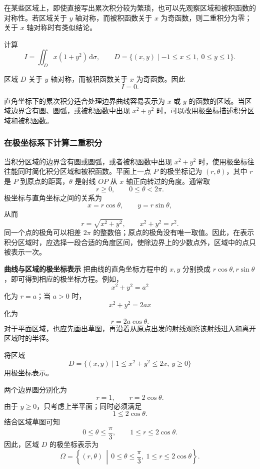 \documentclass[fontset=fandol]{ctexart}
\newenvironment{custom}[1]{\par\noindent\textbf{#1}\quad}{\par\vspace{0.8em}}
\newcommand{\dd}{\mathrm{d}}
\begin{document}
在某些区域上，即使直接写出累次积分较为繁琐，也可以先观察区域和被积函数的对称性。若区域关于 $y$ 轴对称，而被积函数关于 $x$ 为奇函数，则二重积分为零；关于 $x$ 轴对称时有类似结论。

\begin{example}[利用对称性]
计算
\[
I=\iint_Dx(1+y^2)\,\dd\sigma,
\qquad D=\{(x,y)\mid -1\leq x\leq1,\ 0\leq y\leq1\}.
\]

区域 $D$ 关于 $y$ 轴对称，而被积函数关于 $x$ 为奇函数。因此
\[
I=0.
\]
\end{example}

直角坐标下的累次积分适合处理边界曲线容易表示为 $x$ 或 $y$ 的函数的区域。当区域边界含有圆、圆弧，或被积函数中出现 $x^2+y^2$ 时，可以改用极坐标描述积分区域和被积函数。

\subsubsection*{在极坐标系下计算二重积分}

当积分区域的边界含有圆或圆弧，或者被积函数中出现 $x^2+y^2$ 时，使用极坐标往往能同时简化积分区域和被积函数。平面上一点 $P$ 的极坐标记为 $(r,\theta)$，其中 $r$ 是 $P$ 到原点的距离，$\theta$ 是射线 $OP$ 从 $x$ 轴正向转过的角度。通常取
\[
r\geq0,\qquad 0\leq\theta<2\pi.
\]
极坐标与直角坐标之间的关系为
\[
x=r\cos\theta,\qquad y=r\sin\theta,
\]
从而
\[
r=\sqrt{x^2+y^2},\qquad x^2+y^2=r^2.
\]
同一个点的极角可以相差 $2\pi$ 的整数倍；原点的极角没有唯一取值。因此，在表示积分区域时，应选择一段合适的角度区间，使除边界上的少数点外，区域中的点只被表示一次。

\begin{custom}{曲线与区域的极坐标表示}
把曲线的直角坐标方程中的 $x,y$ 分别换成 $r\cos\theta,r\sin\theta$，即可得到相应的极坐标方程。例如，
\[
x^2+y^2=a^2
\]
化为 $r=a$；当 $a>0$ 时，
\[
x^2+y^2=2ax
\]
化为
\[
r=2a\cos\theta.
\]
对于平面区域，也应先画出草图，再沿着从原点出发的射线观察该射线进入和离开区域时的半径。
\end{custom}

\begin{example}[区域的极坐标表示]
将区域
\[
D=\{(x,y)\mid 1\leq x^2+y^2\leq2x,\ y\geq0\}
\]
用极坐标表示。

两个边界圆分别化为
\[
r=1,\qquad r=2\cos\theta.
\]
由于 $y\geq0$，只考虑上半平面；同时必须满足
\[
1\leq2\cos\theta.
\]
结合区域草图可知
\[
0\leq\theta\leq\frac{\pi}{3},\qquad
1\leq r\leq2\cos\theta.
\]
因此，区域 $D$ 的极坐标表示为
\[
\Omega=\left\{(r,\theta)\,\middle|\,
0\leq\theta\leq\frac{\pi}{3},\
1\leq r\leq2\cos\theta\right\}.
\]
\end{example}
\end{document}
